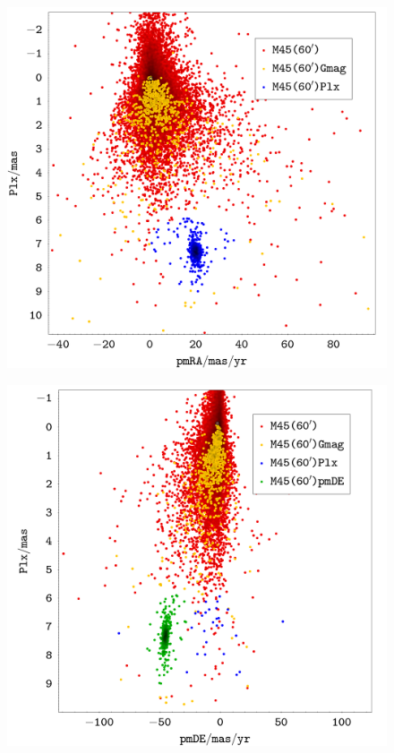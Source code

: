 \documentclass[a4paper,fleqn,usenatbib]{mnras}
\begin{document}
\begin{figure}
  \includegraphics[width=\linewidth]{img/ejercicio2_m45_plx_pmra}
\end{figure}

\begin{figure}
  \includegraphics[width=\linewidth]{img/ejercicio2_m45_plx_pmde}
\end{figure}
\end{document}
